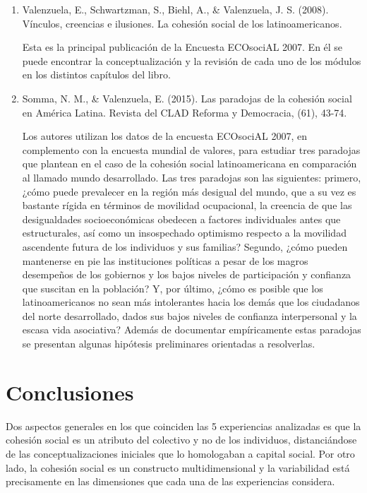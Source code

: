\documentclass[
  12pt,
]{book}
\begin{document}
\begin{enumerate}
\def\labelenumi{\arabic{enumi}.}
\item
  Valenzuela, E., Schwartzman, S., Biehl, A., \& Valenzuela, J. S.
  (2008). Vínculos, creencias e ilusiones. La cohesión social de los
  latinoamericanos.

  Esta es la principal publicación de la Encuesta ECOsociAL 2007. En
  él se puede encontrar la conceptualización y la revisión de cada uno
  de los módulos en los distintos capítulos del libro.\\
\item
  Somma, N. M., \& Valenzuela, E. (2015). Las paradojas de la cohesión
  social en América Latina. Revista del CLAD Reforma y Democracia,
  (61), 43-74.

  Los autores utilizan los datos de la encuesta ECOsociAL 2007, en
  complemento con la encuesta mundial de valores, para estudiar tres
  paradojas que plantean en el caso de la cohesión social
  latinoamericana en comparación al llamado mundo desarrollado. Las
  tres paradojas son las siguientes: primero, ¿cómo puede prevalecer
  en la región más desigual del mundo, que a su vez es bastante rígida
  en términos de movilidad ocupacional, la creencia de que las
  desigualdades socioeconómicas obedecen a factores individuales antes
  que estructurales, así como un insospechado optimismo respecto a la
  movilidad ascendente futura de los individuos y sus familias?
  Segundo, ¿cómo pueden mantenerse en pie las instituciones políticas
  a pesar de los magros desempeños de los gobiernos y los bajos
  niveles de participación y confianza que suscitan en la población?
  Y, por último, ¿cómo es posible que los latinoamericanos no sean más
  intolerantes hacia los demás que los ciudadanos del norte
  desarrollado, dados sus bajos niveles de confianza interpersonal y
  la escasa vida asociativa? Además de documentar empíricamente estas
  paradojas se presentan algunas hipótesis preliminares orientadas a
  resolverlas.
\end{enumerate}

\hypertarget{conclusiones}{%
\chapter{Conclusiones}\label{conclusiones}}

Dos aspectos generales en los que coinciden las 5 experiencias analizadas es que la cohesión social es un atributo del colectivo y no de los individuos, distanciándose de las conceptualizaciones iniciales que lo homologaban a capital social. Por otro lado, la cohesión social es un constructo multidimensional y la variabilidad está precisamente en las dimensiones que cada una de las experiencias considera.
\end{document}
